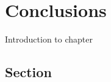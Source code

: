 \chapter{Conclusions}
\label{chap:conclusions}
Introduction to chapter

\section{Section}
\label{sec:conclusions-section}

\newpage